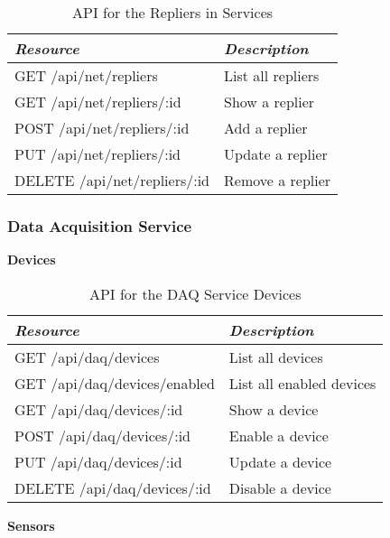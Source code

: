       \begin{table}[H]
        \centering
        \begin{tabular}{p{8cm} p{10cm}}
          \toprule
          \emph{Resource} & \emph{Description} \\ [0.5ex]
          \midrule
          GET /api/net/repliers & List all repliers \\
          GET /api/net/repliers/:id & Show a replier \\
          POST /api/net/repliers/:id & Add a replier \\
          PUT /api/net/repliers/:id & Update a replier \\
          DELETE /api/net/repliers/:id & Remove a replier \\
          \bottomrule
        \end{tabular}
        \caption{API for the Repliers in Services}\label{tab:rest-common-rep}
      \end{table}

    \subsubsection{Data Acquisition Service}\label{sec:rest-daq}

      \large{\textbf{Devices}}

      \begin{table}[H]
        \centering
        \begin{tabular}{p{8cm} p{10cm}}
          \toprule
          \emph{Resource} & \emph{Description} \\ [0.5ex]
          \midrule
          GET /api/daq/devices & List all devices \\
          GET /api/daq/devices/enabled & List all enabled devices \\
          GET /api/daq/devices/:id & Show a device \\
          POST /api/daq/devices/:id & Enable a device \\
          PUT /api/daq/devices/:id & Update a device \\
          DELETE /api/daq/devices/:id & Disable a device \\
          \bottomrule
        \end{tabular}
        \caption{API for the DAQ Service Devices}\label{tab:rest-daq-dev}
      \end{table}

      \large{\textbf{Sensors}}

